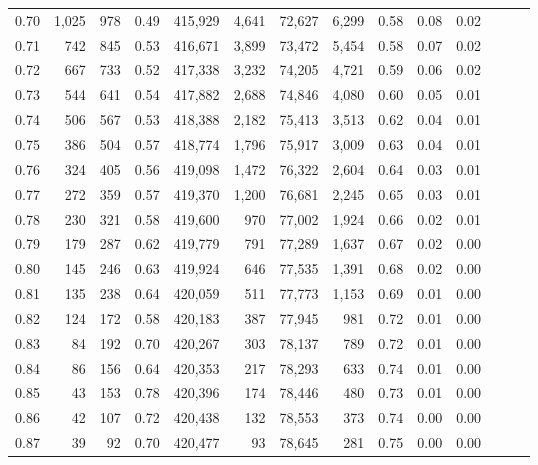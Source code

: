 \begin{tabular}{rrrrrrrrrrrrrr}
0.70 &   1,025 &    978 &  0.49 &  415,929 &    4,641 &  72,627 &   6,299 &  0.58 &  0.08 &      0.02 \\
0.71 &     742 &    845 &  0.53 &  416,671 &    3,899 &  73,472 &   5,454 &  0.58 &  0.07 &      0.02 \\
0.72 &     667 &    733 &  0.52 &  417,338 &    3,232 &  74,205 &   4,721 &  0.59 &  0.06 &      0.02 \\
0.73 &     544 &    641 &  0.54 &  417,882 &    2,688 &  74,846 &   4,080 &  0.60 &  0.05 &      0.01 \\
0.74 &     506 &    567 &  0.53 &  418,388 &    2,182 &  75,413 &   3,513 &  0.62 &  0.04 &      0.01 \\
0.75 &     386 &    504 &  0.57 &  418,774 &    1,796 &  75,917 &   3,009 &  0.63 &  0.04 &      0.01 \\
0.76 &     324 &    405 &  0.56 &  419,098 &    1,472 &  76,322 &   2,604 &  0.64 &  0.03 &      0.01 \\
0.77 &     272 &    359 &  0.57 &  419,370 &    1,200 &  76,681 &   2,245 &  0.65 &  0.03 &      0.01 \\
0.78 &     230 &    321 &  0.58 &  419,600 &      970 &  77,002 &   1,924 &  0.66 &  0.02 &      0.01 \\
0.79 &     179 &    287 &  0.62 &  419,779 &      791 &  77,289 &   1,637 &  0.67 &  0.02 &      0.00 \\
0.80 &     145 &    246 &  0.63 &  419,924 &      646 &  77,535 &   1,391 &  0.68 &  0.02 &      0.00 \\
0.81 &     135 &    238 &  0.64 &  420,059 &      511 &  77,773 &   1,153 &  0.69 &  0.01 &      0.00 \\
0.82 &     124 &    172 &  0.58 &  420,183 &      387 &  77,945 &     981 &  0.72 &  0.01 &      0.00 \\
0.83 &      84 &    192 &  0.70 &  420,267 &      303 &  78,137 &     789 &  0.72 &  0.01 &      0.00 \\
0.84 &      86 &    156 &  0.64 &  420,353 &      217 &  78,293 &     633 &  0.74 &  0.01 &      0.00 \\
0.85 &      43 &    153 &  0.78 &  420,396 &      174 &  78,446 &     480 &  0.73 &  0.01 &      0.00 \\
0.86 &      42 &    107 &  0.72 &  420,438 &      132 &  78,553 &     373 &  0.74 &  0.00 &      0.00 \\
0.87 &      39 &     92 &  0.70 &  420,477 &       93 &  78,645 &     281 &  0.75 &  0.00 &      0.00 \\

\end{tabular}
